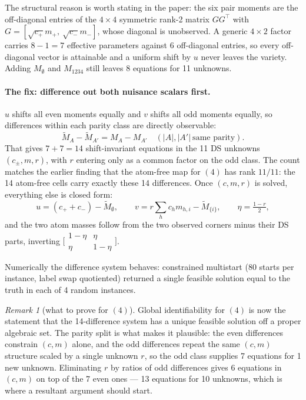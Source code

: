 \documentclass[11pt]{article}
\theoremstyle{remark}
\newtheorem*{remark}{Remark}
\begin{document}
The structural reason is worth stating in the paper: the six pair moments are the off-diagonal entries of the $4\times4$ symmetric rank-2 matrix $GG^\top$ with $G=[\sqrt{c_+}m_+,\ \sqrt{c_-}m_-]$, whose diagonal is unobserved. A generic $4\times2$ factor carries $8-1=7$ effective parameters against 6 off-diagonal entries, so every off-diagonal vector is attainable and a uniform shift by $u$ never leaves the variety. Adding $M_\emptyset$ and $M_{1234}$ still leaves 8 equations for 11 unknowns.

\paragraph{The fix: difference out both nuisance scalars first.} $u$ shifts all even moments equally and $v$ shifts all odd moments equally, so differences within each parity class are directly observable:
\[
\widetilde M_A-\widetilde M_{A'}=M_A-M_{A'}\quad (|A|,|A'|\ \text{same parity}).
\]
That gives $7+7=14$ shift-invariant equations in the 11 DS unknowns $(c_\pm,m,r)$, with $r$ entering only as a common factor on the odd class. The count matches the earlier finding that the atom-free map for $(4)$ has rank $11/11$: the 14 atom-free cells carry exactly these 14 differences. Once $(c,m,r)$ is solved, everything else is closed form:
\[
u=(c_++c_-)-\widetilde M_\emptyset,\qquad
v=r\!\sum_h c_h m_{h,i}-\widetilde M_{\{i\}},\qquad
\eta=\tfrac{1-r}2,
\]
and the two atom masses follow from the two observed corners minus their DS parts, inverting $\bigl[\begin{smallmatrix}1-\eta&\eta\\ \eta&1-\eta\end{smallmatrix}\bigr]$.

Numerically the difference system behaves: constrained multistart (80 starts per instance, label swap quotiented) returned a single feasible solution equal to the truth in each of 4 random instances.

\begin{remark}[what to prove for $(4)$]
Global identifiability for $(4)$ is now the statement that the 14-difference system has a unique feasible solution off a proper algebraic set. The parity split is what makes it plausible: the even differences constrain $(c,m)$ alone, and the odd differences repeat the same $(c,m)$ structure scaled by a single unknown $r$, so the odd class supplies 7 equations for 1 new unknown. Eliminating $r$ by ratios of odd differences gives 6 equations in $(c,m)$ on top of the 7 even ones --- 13 equations for 10 unknowns, which is where a resultant argument should start.
\end{remark}
\end{document}
